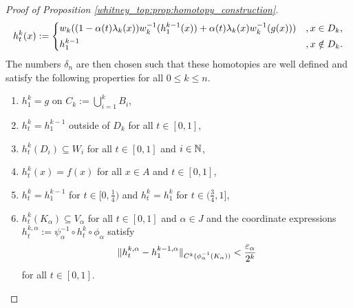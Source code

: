 \begin{proof}[Proof of Proposition \ref{whitney_top:prop:homotopy_construction}]
    \[
    h_t^k(x) := \begin{dcases}
        w_k((1-\alpha(t)\lambda_k(x)) w_k^{-1}(h_1^{k-1}(x)) + \alpha(t)\lambda_k(x)w_k^{-1}(g(x))) &, x \in D_k, \\
        h_1^{k-1} &, x \notin D_k.
    \end{dcases}  
    \]
    The numbers $\delta_n$ are then chosen such that these homotopies are well defined and satisfy the following properties for all $0 \leq k \leq n$.
    \begin{enumerate}[1)]
        \item \label{whitney_top:eq:homotopy_property_1}$h_1^k = g$ on $C_k := \bigcup_{i=1}^k B_i$,
        \item \label{whitney_top:eq:homotopy_property_2}$h_t^k = h_1^{k-1}$ outside of $D_k$ for all $t \in [0,1]$,
        \item \label{whitney_top:eq:homotopy_property_3}$h_t^k(D_i) \subseteq W_i$ for all $t \in [0,1]$ and $i \in \mathbb{N}$,
        \item \label{whitney_top:eq:homotopy_property_4}$h_t^k(x) = f(x)$ for all $x \in A$ and $t \in [0,1]$,
        \item \label{whitney_top:eq:homotopy_property_5}$h_t^k = h_1^{k-1}$ for $t \in [0,\frac{1}{4})$ and $h_t^k = h_1^k$ for $t \in (\frac{3}{4},1]$,
        \item \label{whitney_top:eq:homotopy_property_6} $h_t^k(K_\alpha) \subseteq V_\alpha$ for all $t \in [0,1]$ and $\alpha \in J$ and the coordinate expressions $h_t^{k,\alpha} := \psi_\alpha^{-1} \circ h_t^k \circ \phi_\alpha$ satisfy
        \[
        \lVert h_t^{k,\alpha} - h_1^{k-1,\alpha}\rVert_{C^k(\phi_\alpha^{-1}(K_\alpha))} < \frac{\varepsilon_\alpha}{2^k}
        \]
        for all $t \in [0,1]$.
    \end{enumerate}


\end{proof}
